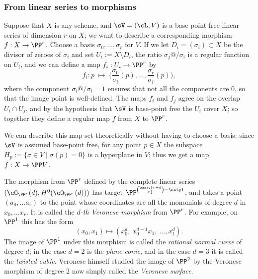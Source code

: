 \subsubsection*{From linear series to morphisms}

Suppose  that $X$ is any scheme, and $\sV = (\cL, V)$ is a base-point
free linear series of dimension $r$ on $X$; we want to describe a
corresponding morphism $f : X \to \PP^r$. Choose a basis $\sigma_0,
\dots, \sigma_r$ for $V$. If we let $D_i = (\sigma_i) \subset X$ be
the divisor of zeroes of $\sigma_i$ and 
set
$U_i := X \setminus D_i$, 
the ratio $\sigma_j@/\sigma_i$ is a regular function on $U_i$, and
we can define a map $f_i : U_i \to \PP^r$ by
$$
f_i : p \; \mapsto \; \Big(\frac{\sigma_0}{\sigma_i}(p), \dots, \frac{\sigma_r}{\sigma_i}(p)\Big), 
$$
where the component $\sigma_i@/\sigma_i = 1$ ensures that not all the components are 0, so that the image point is well-defined.
The maps $f_i$ and $f_j$ agree on the overlap $U_i \cap U_j$, and by the hypothesis that $\sV$ is base-point free the $U_i$ cover $X$;
so together they define a regular map $f$ from $X$ to $\PP^r$. 

We can describe this map set-theoretically without having to choose a basis: since $\sV$ is assumed base-point free, for any point $p \in X$ the subspace $H_p := \{ \sigma \in V \mid \sigma(p) = 0 \}$ is a hyperplane in $V$; thus we get a map $f : X \to \PP V$.

\begin{example}\label{Veronese definition}
The morphism 
\vspace*{-2pt}%
from $\PP^r$ defined by the complete linear series 
$(\cO_{\PP^r}(d), H^0(\cO_{\PP^r}(d)))$ has target
$\PP^{\sssty{r+d\choose r}-\ssty 1}$, 
and takes a point $(a_0,\dots a_r)$ to the point whose coordinates are all the monomials of
degree $d$ in $x_0,\dots x_r$. It is called the \emph{$d$-th Veronese morphism} from $\PP^r$. For example, on $\PP^1$ this has the form
%
%
$$
(x_0,x_1) \mapsto (x_0^d,\ x_0^{d-1}x_1,\ \dots,x_1^d).
$$
The image of $\PP^1$ under this morphism is called 
%
%
%
%
the 
\emph{rational normal curve} 
of degree $d$; in the case $d=2$ is the
\emph{plane conic}, and in the case $d=3$ it is called the 
\emph{twisted cubic}.
Veronese himself studied the image of $\PP^2$
by the Veronese morphism of degree 2 now simply called the 
\emph{Veronese surface}.
\end{example}

